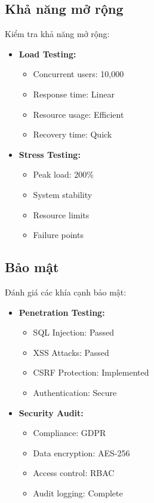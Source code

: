 \subsection{Khả năng mở rộng}
\hspace{0.5cm}Kiểm tra khả năng mở rộng:

\begin{itemize}
    \item \textbf{Load Testing:}
    \begin{itemize}
        \item Concurrent users: 10,000
        \item Response time: Linear
        \item Resource usage: Efficient
        \item Recovery time: Quick
    \end{itemize}
    
    \item \textbf{Stress Testing:}
    \begin{itemize}
        \item Peak load: 200\%
        \item System stability
        \item Resource limits
        \item Failure points
    \end{itemize}
\end{itemize}

\subsection{Bảo mật}
\hspace{0.5cm}Đánh giá các khía cạnh bảo mật:

\begin{itemize}
    \item \textbf{Penetration Testing:}
    \begin{itemize}
        \item SQL Injection: Passed
        \item XSS Attacks: Passed
        \item CSRF Protection: Implemented
        \item Authentication: Secure
    \end{itemize}
    
    \item \textbf{Security Audit:}
    \begin{itemize}
        \item Compliance: GDPR
        \item Data encryption: AES-256
        \item Access control: RBAC
        \item Audit logging: Complete
    \end{itemize}
\end{itemize}


